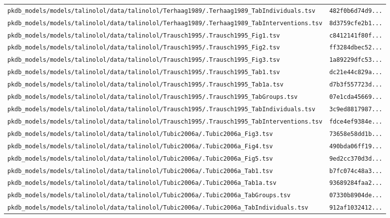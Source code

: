 \documentclass{article}
\begin{document}
\begin{longtable}{ll}
\texttt{pkdb\_models/models/talinolol/data/talinolol/Terhaag1989/.Terhaag1989\_TabIndividuals.tsv} & \texttt{482f0b6d74d9...} \\
\texttt{pkdb\_models/models/talinolol/data/talinolol/Terhaag1989/.Terhaag1989\_TabInterventions.tsv} & \texttt{8d3759cfe2b1...} \\
\texttt{pkdb\_models/models/talinolol/data/talinolol/Trausch1995/.Trausch1995\_Fig1.tsv} & \texttt{c8412141f80f...} \\
\texttt{pkdb\_models/models/talinolol/data/talinolol/Trausch1995/.Trausch1995\_Fig2.tsv} & \texttt{ff3284dbec52...} \\
\texttt{pkdb\_models/models/talinolol/data/talinolol/Trausch1995/.Trausch1995\_Fig3.tsv} & \texttt{1a89229dfc53...} \\
\texttt{pkdb\_models/models/talinolol/data/talinolol/Trausch1995/.Trausch1995\_Tab1.tsv} & \texttt{dc21e44c829a...} \\
\texttt{pkdb\_models/models/talinolol/data/talinolol/Trausch1995/.Trausch1995\_Tab1a.tsv} & \texttt{d7b3f557723d...} \\
\texttt{pkdb\_models/models/talinolol/data/talinolol/Trausch1995/.Trausch1995\_TabGroups.tsv} & \texttt{07e1cda45669...} \\
\texttt{pkdb\_models/models/talinolol/data/talinolol/Trausch1995/.Trausch1995\_TabIndividuals.tsv} & \texttt{3c9ed8817987...} \\
\texttt{pkdb\_models/models/talinolol/data/talinolol/Trausch1995/.Trausch1995\_TabInterventions.tsv} & \texttt{fdce4ef9384e...} \\
\texttt{pkdb\_models/models/talinolol/data/talinolol/Tubic2006a/.Tubic2006a\_Fig3.tsv} & \texttt{73658e58dd1b...} \\
\texttt{pkdb\_models/models/talinolol/data/talinolol/Tubic2006a/.Tubic2006a\_Fig4.tsv} & \texttt{490bda06ff19...} \\
\texttt{pkdb\_models/models/talinolol/data/talinolol/Tubic2006a/.Tubic2006a\_Fig5.tsv} & \texttt{9ed2cc370d3d...} \\
\texttt{pkdb\_models/models/talinolol/data/talinolol/Tubic2006a/.Tubic2006a\_Tab1.tsv} & \texttt{b7fc074c48a3...} \\
\texttt{pkdb\_models/models/talinolol/data/talinolol/Tubic2006a/.Tubic2006a\_Tab1a.tsv} & \texttt{93689284faa2...} \\
\texttt{pkdb\_models/models/talinolol/data/talinolol/Tubic2006a/.Tubic2006a\_TabGroups.tsv} & \texttt{07330b8904de...} \\
\texttt{pkdb\_models/models/talinolol/data/talinolol/Tubic2006a/.Tubic2006a\_TabIndividuals.tsv} & \texttt{912af1032412...} \\

\end{longtable}
\end{document}
